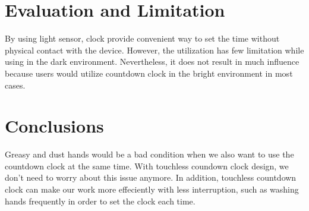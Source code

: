 \documentclass{sig-alternate-ipsn13}
\begin{document}

\section{Evaluation and Limitation}
By using light sensor, clock provide convenient way to set the time without physical contact with the device. However, the utilization has few limitation while using in the dark environment. 
 Nevertheless, it does not result in much influence because users would utilize countdown clock in the bright environment in most cases.

\section{Conclusions}
Greasy and dust hands would be a bad condition when we also want to use the countdown clock at the same time. 
With touchless coundown clock design, we don't need to worry about this issue anymore. In addition, touchless countdown clock can make our work more effeciently with less interruption, such as washing hands frequently in order to set the clock each time.
\end{document}

